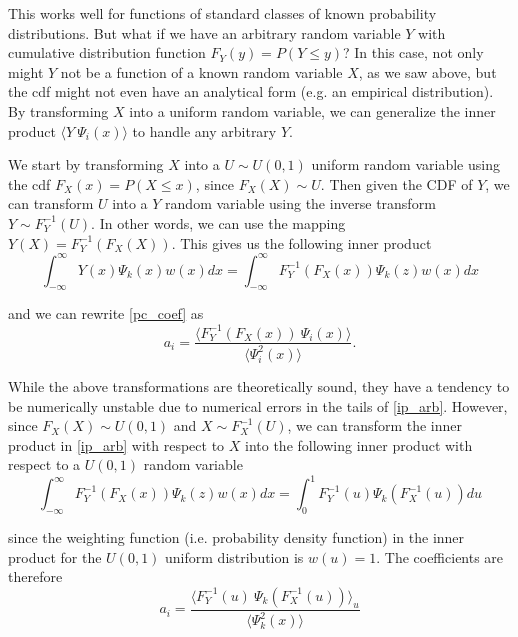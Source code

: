\documentclass[11pt]{article}
\numberwithin{equation}{section}
\begin{document}
This works well for functions of standard classes of known probability distributions. But what if we have an arbitrary random variable $Y$ with cumulative distribution function $F_Y(y) = P(Y \leq y)$? In this case, not only might $Y$ not be a function of a known random variable $X$, as we saw above, but the cdf might not even have an analytical form (e.g. an empirical distribution). By transforming $X$ into a uniform random variable, we can generalize the inner product $\langle Y \ \Psi_i(x) \rangle$ to handle any arbitrary $Y$. 

\qquad We start by transforming $X$ into a $U \sim U(0,1)$ uniform random variable using the cdf $F_X(x) = P(X \leq x)$, since $F_X(X) \sim U$. Then given the CDF of $Y$, we can transform $U$ into a $Y$ random variable using the inverse transform $Y \sim F_Y^{-1}(U)$. In other words, we can use the mapping $Y(X) = F_Y^{-1} (F_X(X))$. This gives us the following inner product
\begin{equation}
\int_{-\infty}^{\infty} Y(x) \Psi_k(x) w(x) dx = \int_{-\infty}^{\infty} F_Y^{-1} (F_X(x)) \Psi_k(z) w(x) dx \label{ip_arb}
\end{equation}

and we can rewrite \eqref{pc_coef} as
\begin{equation}
a_i = \frac{\langle F_Y^{-1} (F_X(x)) \ \Psi_i(x) \rangle}{\langle \Psi_i^2(x) \rangle}. \label{pc_coef_arb}
\end{equation}

While the above transformations are theoretically sound, they have a tendency to be numerically unstable due to numerical errors in the tails of \eqref{ip_arb}. However, since $F_X(X) \sim U(0,1)$ and $X \sim F_X^{-1}(U)$, we can transform the inner product in \eqref{ip_arb} with respect to $X$ into the following inner product with respect to a $U(0, 1)$ random variable
\begin{equation}
\int_{-\infty}^{\infty} F_Y^{-1} (F_X(x)) \Psi_k(z) w(x) dx = \int_{0}^{1} F_Y^{-1} (u) \Psi_k(F_X^{-1}(u)) du \label{ip_unif}
\end{equation}

since the weighting function (i.e. probability density function) in the inner product for the $U(0,1)$ uniform distribution is $w(u) = 1$. The coefficients are therefore
\begin{equation}
a_i = \frac{\langle F_Y^{-1}(u) \ \Psi_k(F_X^{-1}(u)) \rangle_u}{\langle \Psi_k^2(x) \rangle} \label{pc_coef_unif}
\end{equation}
\end{document}
